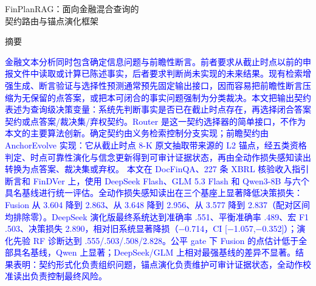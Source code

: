 \documentclass[12pt,openany]{ctexbook}
\newcommand{\method}{FinPlanRAG}
\newcommand{\rev}[1]{\textcolor{blue}{#1}}
\begin{document}
\clearpage
{}
{}
\begin{center}
{\heiti \method：面向金融混合查询的\\[0.2cm]
契约路由与锚点演化框架\par}
\vspace{0.2cm}
{\heiti 摘\quad 要\par}
\end{center}
\vspace{0.2cm}
{\songti\sloppy
\setlength{\parindent}{0pt}
\setlength{\emergencystretch}{2em}
\hspace*{2em}\rev{金融文本分析同时包含确定信息问题与前瞻性断言。前者要求从截止时点以前的申报文件中读取或计算已陈述事实，后者要求判断尚未实现的未来结果。现有检索增强生成、断言验证与选择性预测通常预先固定输出接口，因而容易把前瞻性断言压缩为无保留的点答案，或把本可闭合的事实问题强制为分类裁决。本文把输出契约表述为查询级决策变量：系统先判断事实是否已在截止时点存在，再选择闭合答案契约或点答案/裁决集/弃权契约。Router 是这一契约选择器的简单接口，不作为本文的主要算法创新。确定契约由义务检索控制分支实现；前瞻契约由 AnchorEvolve 实现：它从截止时点 8-K 原文抽取带来源的 L2 锚点，经五类资格判定、时点可靠性演化与信念更新得到可审计证据状态，再由全动作损失感知读出转换为点答案、裁决集或弃权。}
\hspace*{2em}\rev{本文在 DocFinQA、227 条 XBRL 核验收入指引断言和 FinDVer 上，使用 DeepSeek Flash、GLM 5.3 Flash 和 Qwen3-8B 与六个具名基线进行统一评估。全动作损失感知读出在三个基座上显著降低决策损失：Fusion 从 3.604 降到 2.863、从 3.648 降到 2.956、从 3.577 降到 2.837（配对区间均排除零）。DeepSeek 演化版最终系统达到准确率 .551、平衡准确率 .489、宏 F1 .503、决策损失 2.890，相对旧系统显著降损（−0.714，CI [−1.057,−0.352]）；演化先验 RF 诊断达到 .555/.503/.508/2.828。公平 gate 下 Fusion 的点估计低于全部具名基线，Qwen 上显著；DeepSeek/GLM 上相对最强基线的差异不显著。结果表明：契约形式化负责组织问题，锚点演化负责维护可审计证据状态，全动作校准读出负责控制最终风险。}
}
\end{document}
